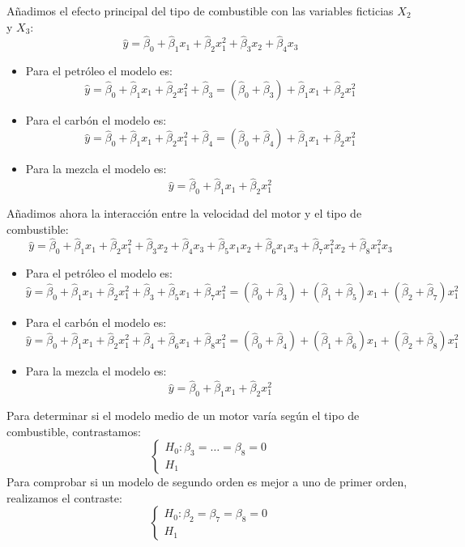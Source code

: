 \begin{example}
    Añadimos el efecto principal del tipo de combustible con las variables ficticias $X_2$ y $X_3$:
    $$\hat{y} = \hat{\beta}_0 + \hat{\beta}_1x_1 + \hat{\beta}_2x_1^2 + \hat{\beta}_3x_2 + \hat{\beta}_4x_3$$
    \begin{itemize}
        \item Para el petróleo el modelo es:
              $$\hat{y} = \hat{\beta}_0 + \hat{\beta}_1x_1 + \hat{\beta}_2x_1^2 + \hat{\beta}_3 = (\hat{\beta}_0 + \hat{\beta}_3) + \hat{\beta}_1x_1 + \hat{\beta}_2x_1^2$$
        \item Para el carbón el modelo es:
              $$\hat{y} = \hat{\beta}_0 + \hat{\beta}_1x_1 + \hat{\beta}_2x_1^2 + \hat{\beta}_4 = (\hat{\beta}_0 + \hat{\beta}_4) + \hat{\beta}_1x_1 + \hat{\beta}_2x_1^2$$
        \item Para la mezcla el modelo es:
              $$\hat{y} = \hat{\beta}_0 + \hat{\beta}_1x_1 + \hat{\beta}_2x_1^2$$
    \end{itemize}

    Añadimos ahora la interacción entre la velocidad del motor y el tipo de combustible:
    $$\hat{y} = \hat{\beta}_0 + \hat{\beta}_1x_1 + \hat{\beta}_2x_1^2 + \hat{\beta}_3x_2 + \hat{\beta}_4x_3 + \hat{\beta}_5x_1x_2 + \hat{\beta}_6x_1x_3 + \hat{\beta}_7x_1^2x_2 + \hat{\beta}_8x_1^2x_3$$
    \begin{itemize}
        \item Para el petróleo el modelo es:
              $$\hat{y} = \hat{\beta}_0 + \hat{\beta}_1x_1 + \hat{\beta}_2x_1^2 + \hat{\beta}_3 + \hat{\beta}_5x_1 + \hat{\beta}_7x_1^2 = (\hat{\beta}_0 + \hat{\beta}_3) + (\hat{\beta}_1 + \hat{\beta}_5)x_1 + (\hat{\beta}_2 + \hat{\beta}_7)x_1^2$$
        \item Para el carbón el modelo es:
              $$\hat{y} = \hat{\beta}_0 + \hat{\beta}_1x_1 + \hat{\beta}_2x_1^2 + \hat{\beta}_4 + \hat{\beta}_6x_1 + \hat{\beta}_8x_1^2 = (\hat{\beta}_0 + \hat{\beta}_4) + (\hat{\beta}_1 + \hat{\beta}_6)x_1 + (\hat{\beta}_2 + \hat{\beta}_8)x_1^2$$
        \item Para la mezcla el modelo es:
              $$\hat{y} = \hat{\beta}_0 + \hat{\beta}_1x_1 + \hat{\beta}_2x_1^2$$
    \end{itemize}

    Para determinar si el modelo medio de un motor varía según el tipo de combustible, contrastamos:
    $$\begin{cases}
            H_0: \beta_3 = \dots = \beta_8 = 0 \\
            H_1
        \end{cases}$$
    Para comprobar si un modelo de segundo orden es mejor a uno de primer orden, realizamos el contraste:
    $$\begin{cases}
            H_0: \beta_2 = \beta_7 = \beta_8 = 0 \\
            H_1
        \end{cases}$$
\end{example}